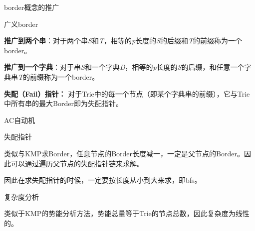 \documentclass{ctexbeamer}		%
\begin{document}
\begin{frame}{border概念的推广}

\begin{block}{广义border}

\textbf{推广到两个串}：对于两个串\textit{S}和\textit{T}，相等的\textit{p}长度的\textit{S}的后缀和\textit{T}的前缀称为一个border。

\pause 

\hphantom{}

\textbf{推广到一个字典}：对于串\textit{S}和一个字典\textit{D}，相等的\textit{p}长度的\textit{S}的后缀，和任意一个字典串\textit{T}的前缀称为一个border。

\pause

\hphantom{}

\textbf{\color{red}失配（Fail）指针：} 
对于Trie中的每一个节点（即某个字典串的前缀），它与Trie中所有串的最大Border即为失配指针。

\end{block}
    
\end{frame}

\begin{frame}{AC自动机}

\begin{block}{失配指针}

类似与KMP求Border，任意节点的Border长度减一，一定是父节点的Border。因此可以通过遍历父节点的失配指针链来求解。

\pause

因此在求失配指针的时候，一定要按长度从小到大来求，即bfs。

\end{block}
    
\pause

\begin{block}{复杂度分析}

类似于KMP的势能分析方法，势能总量等于Trie的节点总数，因此复杂度为线性的。

\end{block}

\end{frame}
\end{document}
